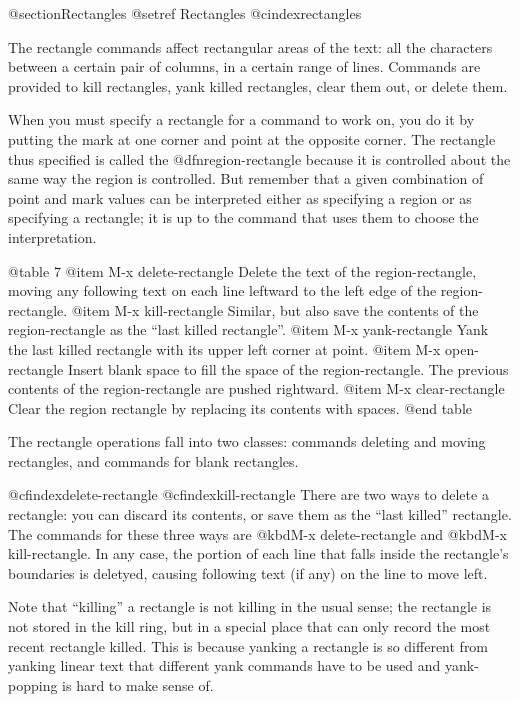 {{{{{{@section{Rectangles}
@setref Rectangles
@cindex{rectangles}

  The rectangle commands affect rectangular areas of the text: all the
characters between a certain pair of columns, in a certain range of lines.
Commands are provided to kill rectangles, yank killed rectangles, clear
them out, or delete them.

  When you must specify a rectangle for a command to work on, you do
it by putting the mark at one corner and point at the opposite corner.
The rectangle thus specified is called the @dfn{region-rectangle}
because it is controlled about the same way the region is controlled.
But remember that a given combination of point and mark values can be
interpreted either as specifying a region or as specifying a
rectangle; it is up to the command that uses them to choose the
interpretation.

@table 7
@item M-x delete-rectangle
Delete the text of the region-rectangle, moving any following text on
each line leftward to the left edge of the region-rectangle.
@item M-x kill-rectangle
Similar, but also save the contents of the region-rectangle as the
``last killed rectangle''.
@item M-x yank-rectangle
Yank the last killed rectangle with its upper left corner at point.
@item M-x open-rectangle
Insert blank space to fill the space of the region-rectangle.
The previous contents of the region-rectangle are pushed rightward.
@item M-x clear-rectangle
Clear the region rectangle by replacing its contents with spaces.
@end table

  The rectangle operations fall into two classes: commands deleting and
moving rectangles, and commands for blank rectangles.

@cfindex{delete-rectangle}
@cfindex{kill-rectangle}
  There are two ways to delete a rectangle: you can discard its contents,
or save them as the ``last killed'' rectangle.  The commands for these
three ways are @kbd{M-x delete-rectangle} and @kbd{M-x kill-rectangle}.  In
any case, the portion of each line that falls inside the rectangle's
boundaries is deletyed, causing following text (if any) on the line to move
left.

  Note that ``killing'' a rectangle is not killing in the usual sense; the
rectangle is not stored in the kill ring, but in a special place that
can only record the most recent rectangle killed.  This is because yanking
a rectangle is so different from yanking linear text that different yank
commands have to be used and yank-popping is hard to make sense of.

}}}}}}
